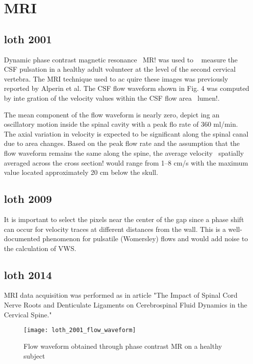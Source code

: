 \documentclass{report}
\begin{document}
\section{MRI}
\subsection{loth 2001}
Dynamic phase contrast magnetic resonance ~MR! was used to
~
measure the CSF pulsation in a healthy adult volunteer at the level
of the second cervical vertebra. The MRI technique used to ac
quire
these images was previously reported by Alperin et al.
The CSF flow waveform shown in Fig. 4 was computed by inte
gration
of the velocity values within the CSF flow area ~lumen!.

The mean component of the flow waveform is nearly zero, depict
ing
an oscillatory motion inside the spinal cavity with a peak flo
rate of 360 ml/min. The axial variation in velocity is expected to
be significant along the spinal canal due to area changes. Based on
the peak flow rate and the assumption that the flow waveform
remains the same along the spine, the average velocity ~spatially
~
averaged across the cross section! would range from 1–8 cm/s
with the maximum value located approximately 20 cm below the
skull.

\subsection{loth 2009}

It is important to select the
pixels near the center of the gap since a phase shift can occur for velocity
traces at different distances from the wall. This is a well-documented
phenomenon for pulsatile (Womersley) flows and would add noise to
the calculation of VWS.

\subsection{loth 2014}
MRI data acquisition was performed as in article "The Impact of Spinal Cord
 Nerve Roots and Denticulate Ligaments on Cerebrospinal Fluid Dynamics in
 the Cervical Spine."


\begin{figure}[!h]
\centering
\caption{\label{anatomy} Flow waveform obtained through phase contrast MR on a healthy subject}
    \texttt{[image: loth\_2001\_flow\_waveform]}
\end{figure}
\end{document}

